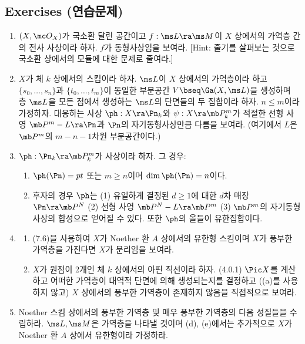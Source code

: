 	
	
	\subsection*{Exercises (연습문제)}
	
	\begin{enumerate}[label=\tb{7.\arabic*.},itemindent=0mm,itemsep=2mm]
	\item $(X,\mc O_X)$가 국소환 달린 공간이고 $f:\ms L\ra\ms M$이 $X$ 상에서의 가역층 간의 전사 사상이라 하자.
	$f$가 동형사상임을 보여라. [Hint: 줄기를 살펴보는 것으로 국소환 상에서의 모듈에 대한 문제로 줄여라.]
	\item $X$가 체 $k$ 상에서의 스킴이라 하자. $\ms L$이 $X$ 상에서의 가역층이라 하고
	$\{s_0,\ldots,s_n\}$과 $\{t_0,\ldots,t_m\}$이 동일한 부분공간 $V\bseq\Ga(X,\ms L)$을 생성하며
	층 $\ms L$을 모든 점에서 생성하는 $\ms L$의 단면들의 두 집합이라 하자.
	$n\le m$이라 가정하자. 대응하는 사상 $\ph:X\ra\Pn_k$와 $\psi:X\ra\mb P^m_k$가
	적절한 선형 사영 $\mb P^m-L\ra\Pn$과 $\Pn$의 자기동형사상만큼 다름을 보여라.
	(여기에서 $L$은 $\mb P^m$의 $m-n-1$차원 부분공간이다.)
	\item $\ph:\Pn_k\ra\mb P^m_k$가 사상이라 하자. 그 경우:
	\begin{enumerate}[label=(\alph*)]
	\item $\ph(\Pn)=pt$ 또는 $m\ge n$이며 $\dim\ph(\Pn)=n$이다.
	\item 후자의 경우 $\ph$는 (1) 유일하게 결정된 $d\ge 1$에 대한 $d$차 매장 $\Pn\ra\mb P^N$
	(2) 선형 사영 $\mb P^N-L\ra\mb P^m$ (3) $\mb P^m$의 자기동형사상의 합성으로 얻어질 수 있다. 또한 $\ph$의 올들이 유한집합이다.
	\end{enumerate}
	\item \begin{enumerate}[label=(\alph*)]
	\item (7.6)을 사용하여 $X$가 Noether 환 $A$ 상에서의 유한형 스킴이며 $X$가 풍부한 가역층을 가진다면 $X$가 분리임을 보여라.
	\item $X$가 원점이 2개인 체 $k$ 상에서의 아핀 직선이라 하자. (4.0.1)
	$\Pic X$를 계산하고 어떠한 가역층이 대역적 단면에 의해 생성되는지를 결정하고
	((a)를 사용하지 않고) $X$ 상에서의 풍부한 가역층이 존재하지 않음을 직접적으로 보여라.
	\end{enumerate}
	\item Noether 스킴 상에서의 풍부한 가역층 및 매우 풍부한 가역층의 다음 성질들을 수립하라.
	$\ms L,\ms M$은 가역층을 나타낼 것이며 (d), (e)에서는 추가적으로 $X$가 Noether 환 $A$ 상에서 유한형이라 가정하라.

\end{enumerate}
